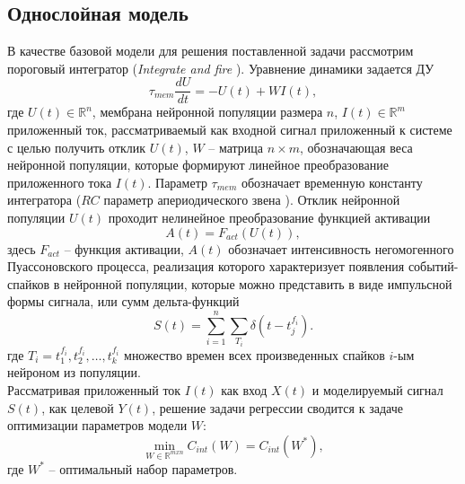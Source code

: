 \subsection{Однослойная модель}
\indent В качестве базовой модели для решения поставленной задачи рассмотрим пороговый интегратор (\textit{Integrate and fire} \cite{burkitt2006review}). Уравнение динамики задается ДУ
\begin{equation}
\tau_{mem} \frac{dU}{dt} = -U(t) + W I(t),
\end{equation}
где $U(t) \in \mathbb{R}^{n}$, мембрана нейронной популяции размера $n$, $I(t) \in \mathbb{R}^{m}$ приложенный ток, рассматриваемый как входной сигнал приложенный к системе с целью получить отклик $U(t)$, $W$ -- матрица $n \times m$, обозначающая веса нейронной популяции, которые формируют линейное преобразование приложенного тока $I(t)$. Параметр $\tau_{mem}$ обозначает временную константу интегратора ($RC$ параметр апериодического звена \cite{auto_control_theory}). Отклик нейронной популяции $U(t)$ проходит нелинейное преобразование функцией активации
\begin{equation} \label{eq:p2_2_act}
A(t) = F_{act}(U(t)),
\end{equation}
здесь $F_{act}$ -- функция активации, $A(t)$ обозначает интенсивность негомогенного Пуассоновского процесса, реализация которого характеризует появления событий-спайков в нейронной популяции, которые можно представить в виде импульсной формы сигнала, или сумм дельта-функций
\begin{equation} \label{eq:p2_2_poiss}
S(t) = \sum_{i=1}^n \sum_{T_{i}} \delta(t - t_{j}^{f_{i}}).
\end{equation}
где $T_{i} = {t_{1}^{f_{i}}, t_{2}^{f_{i}}, \dots, t_{k}^{f_{i}}}$ множество времен всех произведенных спайков $i$-ым нейроном из популяции.\\
\indent Рассматривая приложенный ток $I(t)$ как вход $X(t)$ и моделируемый сигнал $S(t)$, как целевой $Y(t)$, решение задачи регрессии сводится к задаче оптимизации параметров модели $W$:
\begin{equation}
\min_{W \in \mathbb{R}^{m x n}} C_{int}(W) = C_{int}(W^{\ast}),
\end{equation}
где $W^{\ast}$ -- оптимальный набор параметров.

